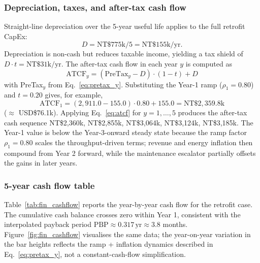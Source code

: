 \documentclass[conference]{IEEEtran}
\begin{document}
\subsubsection{Depreciation, taxes, and after-tax cash flow}

Straight-line depreciation over the 5-year useful life applies to the full retrofit CapEx:
\begin{equation}
D = \text{NT\$}775\text{k} / 5 = \text{NT\$}155\text{k/yr}.
\end{equation}
Depreciation is non-cash but reduces taxable income, yielding a tax shield of $D \cdot t = \text{NT\$}31\text{k/yr}$. The after-tax cash flow in each year $y$ is computed as
\begin{equation}
\text{ATCF}_y = (\text{PreTax}_y - D) \cdot (1 - t) + D
\label{eq:atcf}
\end{equation}
with PreTax$_y$ from Eq.~\eqref{eq:pretax_y}. Substituting the Year-1 ramp ($\rho_1=0.80$) and $t = 0.20$ gives, for example,
\begin{equation}
\text{ATCF}_1 = (2{,}911.0 - 155.0) \cdot 0.80 + 155.0 = \text{NT\$}2{,}359.8\text{k}
\end{equation}
($\approx$ USD\$76.1k). Applying Eq.~\eqref{eq:atcf} for $y = 1,\ldots,5$ produces the after-tax cash sequence NT\$2{,}360k, NT\$2{,}855k, NT\$3{,}064k, NT\$3{,}124k, NT\$3{,}185k. The Year-1 value is below the Year-3-onward steady state because the ramp factor $\rho_1 = 0.80$ scales the throughput-driven terms; revenue and energy inflation then compound from Year 2 forward, while the maintenance escalator partially offsets the gains in later years.

\subsubsection{5-year cash flow table}

Table~\ref{tab:fin_cashflow} reports the year-by-year cash flow for the retrofit case. The cumulative cash balance crosses zero within Year 1, consistent with the interpolated payback period $\text{PBP} \approx 0.317\,\text{yr} \approx 3.8$ months. Figure~\ref{fig:fin_cashflow} visualises the same data; the year-on-year variation in the bar heights reflects the ramp + inflation dynamics described in Eq.~\eqref{eq:pretax_y}, not a constant-cash-flow simplification.
\end{document}
